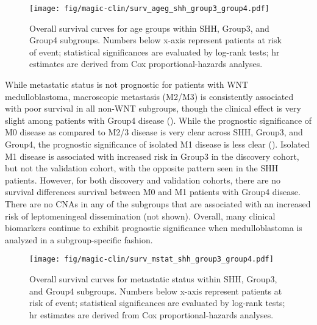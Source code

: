 \begin{figure}[ht]
	\begin{center}
		\texttt{[image: fig/magic-clin/surv\_ageg\_shh\_group3\_group4.pdf]}
	\end{center}
	\caption[Overall survival curves for age groups within SHH, Group3, and Group4 subgroups]
	{
		Overall survival curves for age groups within SHH, Group3, and Group4 subgroups.
		Numbers below x-axis represent patients at risk of event; statistical significances are evaluated by log-rank tests; \gls{hr} estimates are derived from Cox proportional-hazards analyses.
	}
	\label{fig:surv_ageg_shh_group3_group4}
\end{figure}

While metastatic status is not prognostic for patients with WNT medulloblastoma, macroscopic metastasis (M2/M3) is consistently associated with poor survival in all non-WNT subgroups, though the clinical effect is very slight among patients with Group4 disease (). While the prognostic significance of M0 disease as compared to M2/3 disease is very clear across SHH, Group3, and Group4, the prognostic significance of isolated M1 disease is less clear (). Isolated M1 disease is associated with increased risk in Group3 in the discovery cohort, but not the validation cohort, with the opposite pattern seen in the SHH patients. However, for both discovery and validation cohorts, there are no survival differences survival between M0 and M1 patients with Group4 disease. There are no CNAs in any of the subgroups that are associated with an increased risk of leptomeningeal dissemination (not shown). Overall, many clinical biomarkers continue to exhibit prognostic significance when medulloblastoma is analyzed in a subgroup-specific fashion.

\begin{figure}[ht]
	\begin{center}
		\texttt{[image: fig/magic-clin/surv\_mstat\_shh\_group3\_group4.pdf]}
	\end{center}
	\caption[Overall survival curves for metastatic status within SHH, Group3, and Group4 subgroups]
	{
	Overall survival curves for metastatic status within SHH, Group3, and Group4 subgroups.
	Numbers below x-axis represent patients at risk of event; statistical significances are evaluated by log-rank tests; \gls{hr} estimates are derived from Cox proportional-hazards analyses.
	}
	\label{fig:surv_mstat_shh_group3_group4}
\end{figure}

